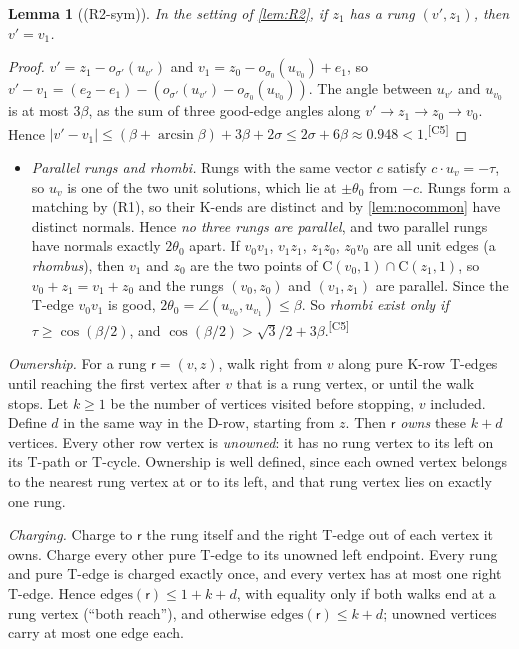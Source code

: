 \documentclass[11pt]{amsart}
\newtheorem{lemma}[theorem]{Lemma}
\theoremstyle{definition}
\theoremstyle{remark}
\newcommand{\Cc}{\mathrm{C}}      %
\newcommand{\chk}[1]{\textsuperscript{[#1]}}
\begin{document}
\begin{lemma}[(R2-sym)]\label{lem:R2sym}
In the setting of \cref{lem:R2}, if $z_1$ has a rung $(v',z_1)$, then $v'=v_1$.
\end{lemma}
\begin{proof}
$v'=z_1-o_{\sigma'}(u_{v'})$ and $v_1=z_0-o_{\sigma_0}(u_{v_0})+e_1$, so $v'-v_1=(e_2-e_1)-(o_{\sigma'}(u_{v'})-o_{\sigma_0}(u_{v_0}))$. The angle between $u_{v'}$ and $u_{v_0}$ is at most $3\beta$, as the sum of three good-edge angles along $v'\to z_1\to z_0\to v_0$. Hence $|v'-v_1|\le(\beta+\arcsin\beta)+3\beta+2\sigma\le2\sigma+6\beta\approx0.948<1$.\chk{C5}
\end{proof}

\begin{itemize}[leftmargin=2em]
\item[(R3)] \emph{Parallel rungs and rhombi.} Rungs with the same vector $c$ satisfy $c\cdot u_v=-\tau$, so $u_v$ is one of the two unit solutions, which lie at $\pm\theta_0$ from $-c$. Rungs form a matching by (R1), so their K-ends are distinct and by \cref{lem:nocommon} have distinct normals. Hence \emph{no three rungs are parallel}, and two parallel rungs have normals exactly $2\theta_0$ apart. If $v_0v_1$, $v_1z_1$, $z_1z_0$, $z_0v_0$ are all unit edges (a \emph{rhombus}), then $v_1$ and $z_0$ are the two points of $\Cc(v_0,1)\cap\Cc(z_1,1)$, so $v_0+z_1=v_1+z_0$ and the rungs $(v_0,z_0)$ and $(v_1,z_1)$ are parallel. Since the T-edge $v_0v_1$ is good, $2\theta_0=\angle(u_{v_0},u_{v_1})\le\beta$. So \emph{rhombi exist only if $\tau\ge\cos(\beta/2)$}, and $\cos(\beta/2)>\sqrt3/2+3\beta$.\chk{C5}
\end{itemize}

\emph{Ownership.} For a rung $\mathsf r=(v,z)$, walk right from $v$ along pure K-row T-edges until reaching the first vertex after $v$ that is a rung vertex, or until the walk stops. Let $k\ge1$ be the number of vertices visited before stopping, $v$ included. Define $d$ in the same way in the D-row, starting from $z$. Then $\mathsf r$ \emph{owns} these $k+d$ vertices. Every other row vertex is \emph{unowned}: it has no rung vertex to its left on its T-path or T-cycle. Ownership is well defined, since each owned vertex belongs to the nearest rung vertex at or to its left, and that rung vertex lies on exactly one rung.

\emph{Charging.} Charge to $\mathsf r$ the rung itself and the right T-edge out of each vertex it owns. Charge every other pure T-edge to its unowned left endpoint. Every rung and pure T-edge is charged exactly once, and every vertex has at most one right T-edge. Hence $\mathrm{edges}(\mathsf r)\le1+k+d$, with equality only if both walks end at a rung vertex (``both reach''), and otherwise $\mathrm{edges}(\mathsf r)\le k+d$; unowned vertices carry at most one edge each.
\end{document}
